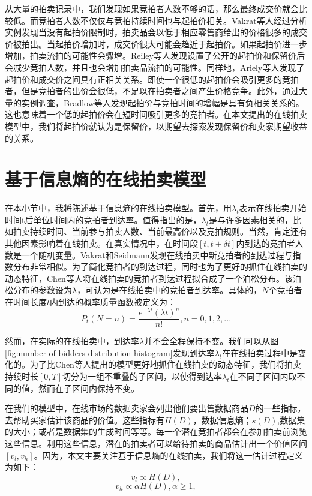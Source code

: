 从大量的拍卖记录中，我们发现如果竞拍者人数不够的话，那么最终成交价就会比较低。而竞拍者人数不仅仅与竞拍持续时间也与起拍价相关。Vakrat等人\cite{Pinker2001Using}经过分析实例发现当没有起拍价限制时，拍卖品会以低于相应零售商给出的价格很多的成交价被拍出。当起拍价增加时，成交价很大可能会趋近于起拍价。如果起拍价进一步增加，拍卖流拍的可能性会骤增。Reiley等人\cite{Ockenfels2006Online}发现设置了公开的起拍价和保留价后会减少竞拍人数，并且也会增加拍卖品流拍的可能性。同样地，Ariely等人\cite{Dan2003Buying}发现了起拍价和成交价之间具有正相关关系。即使一个很低的起拍价会吸引更多的竞拍者，但是竞拍者的出价会很低，不足以在拍卖者之间产生价格竞争。此外，通过大量的实例调查，Bradlow等人\cite{Bradlow2007Bayesian}发现起拍价与竞拍时间的增幅是具有负相关关系的。这也意味着一个低的起拍价会在短时间吸引更多的竞拍者。在本文提出的在线拍卖模型中，我们将起拍价就认为是保留价，以期望去探索发现保留价和卖家期望收益的关系。

\section{基于信息熵的在线拍卖模型}
在本小节中，我将陈述基于信息熵的在线拍卖模型。首先，用$\lambda_t$表示在线拍卖开始时间t后单位时间内的竞拍者到达率。值得指出的是，$\lambda_t$是与许多因素相关的，比如拍卖持续时间、当前参与拍卖人数、当前最高价以及竞拍规则。当然，肯定还有其他因素影响着在线拍卖。在真实情况中，在时间段$[t,t+\delta t]$内到达的竞拍者人数是一个随机变量。Vakrat和Seidmann\cite{Vakrat2000Implications}发现在线拍卖中新竞拍者的到达过程与指数分布非常相似。为了简化竞拍者的到达过程，同时也为了更好的抓住在线拍卖的动态特征，Chen等人\cite{Chen2007Optimal}将在线拍卖的竞拍者到达过程拟合成了一个泊松分布。该泊松分布的参数设为$\lambda$，可认为是在线拍卖中的竞拍者到达率。具体的，$N$个竞拍者在时间长度$t$内到达的概率质量函数被定义为：
\begin{equation}
\label{eq:number of bidder}
P_t(N=n)=\frac{e^{-\lambda t}(\lambda t)^n}{n!},n=0,1,2,...
\end{equation}

然而，在实际的在线拍卖中，到达率$\lambda$并不会全程保持不变。我们可以从图\ref{fig:number of bidders distribution histogram}发现到达率$\lambda_t$在在线拍卖过程中是变化的。为了比Chen等人提出的模型更好地抓住在线拍卖的动态特征，我们将拍卖持续时长$[0,T]$切分为一组不重叠的子区间，以使得到达率$\lambda_t$在不同子区间内取不同的值，然而在子区间内保持不变。

在我们的模型中，在线市场的数据卖家会列出他们要出售数据商品$D$的一些指标，去帮助买家估计该商品的价值。这些指标有$H(D)$，数据信息熵\cite{li2017first}；$s(D)$,数据集的大小；或者是数据集的生成时间等等。每一个潜在竞拍者都会在参加拍卖前浏览这些信息。利用这些信息，潜在的拍卖者可以给待拍卖的商品估计出一个价值区间$[v_l,v_h]$。因为，本文主要关注基于信息熵的在线拍卖，我们将这一估计过程定义为如下：
\begin{equation}
\label{eq:v_l}
v_l \propto H(D),
\end{equation}
\begin{equation}
\label{eq:v_h}
v_h \propto\alpha H(D),\alpha\ge 1,
\end{equation}

